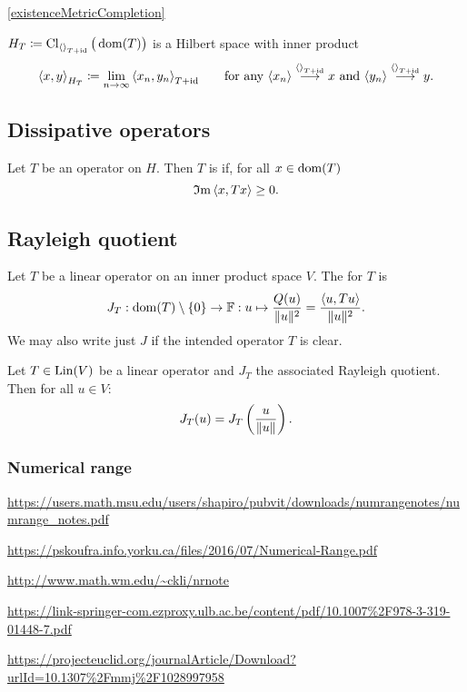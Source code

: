 \ref{existenceMetricCompletion}

$H_T \defeq \Closure_{\inner{}_{T+\id}}\big(\dom(T)\big)$ is a Hilbert space with inner product
\[ \inner{x,y}_{H_T} \defeq \lim_{n\to \infty} \inner{x_n,y_n}_{T+\id} \qquad \text{for any $\seq{x_n} \overset{\inner{}_{T+\id}}{\longrightarrow} x$ and $\seq{y_n} \overset{\inner{}_{T+\id}}{\longrightarrow} y$.} \]


\subsection{Dissipative operators}
\begin{definition}
Let $T$ be an operator on $H$. Then $T$ is  if, for all $x\in\operatorname{dom}(T)$
\[ \Im \inner{x,Tx} \geq 0. \]
\end{definition}

\subsection{Rayleigh quotient}
\begin{definition}
Let $T$ be a linear operator on an inner product space $V$. The  for $T$ is 
\[ J_T: \dom(T)\setminus\{0\}\to \F: u\mapsto \frac{Q(u)}{\norm{u}^2} = \frac{\inner{u,Tu}}{\norm{u}^2}. \]
We may also write just $J$ if the intended operator $T$ is clear.
\end{definition}

\begin{lemma}
Let $T\in\operatorname{Lin}(V)$ be a linear operator and $J_T$ the associated Rayleigh quotient. Then for all $u\in V$:
\[ J_T(u) = J_T\left(\frac{u}{\lVert u\rVert}\right). \]
\end{lemma}

\subsubsection{Numerical range}
\url{https://users.math.msu.edu/users/shapiro/pubvit/downloads/numrangenotes/numrange_notes.pdf}

\url{https://pskoufra.info.yorku.ca/files/2016/07/Numerical-Range.pdf}

\url{http://www.math.wm.edu/~ckli/nrnote}

\url{https://link-springer-com.ezproxy.ulb.ac.be/content/pdf/10.1007%2F978-3-319-01448-7.pdf}

\url{https://projecteuclid.org/journalArticle/Download?urlId=10.1307%2Fmmj%2F1028997958}

